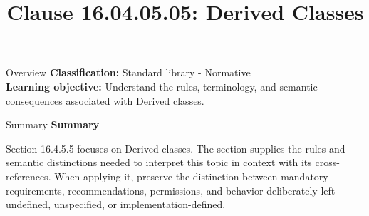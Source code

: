 \documentclass[10pt,letterpaper]{article}
\title{Clause 16.04.05.05: Derived Classes}
\author{}
\date{}
\begin{document}
\maketitle
\begin{CornellOverviewBox}{Overview}
\textbf{Classification:} Standard library - Normative\\[2pt]
\textbf{Learning objective:} Understand the rules, terminology, and semantic consequences associated with Derived classes.
\end{CornellOverviewBox}\begin{CornellSummaryBox}{Summary}
{\sffamily\bfseries\color{Accent} Summary}\par\vspace{3pt}Section 16.4.5.5 focuses on Derived classes. The section supplies the rules and semantic distinctions needed to interpret this topic in context with its cross-references. When applying it, preserve the distinction between mandatory requirements, recommendations, permissions, and behavior deliberately left undefined, unspecified, or implementation-defined.
\end{CornellSummaryBox}
\end{document}
